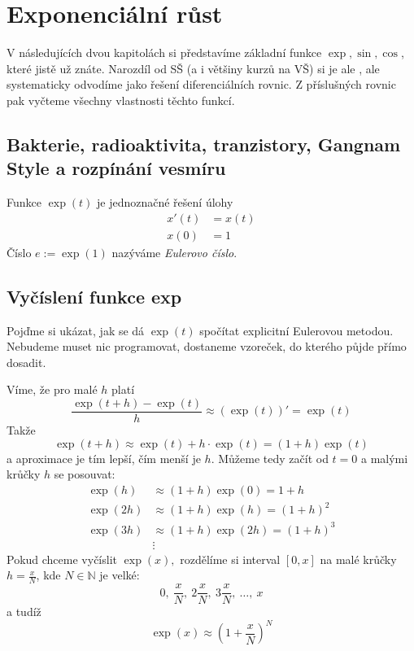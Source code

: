 \chapter{Exponenciální růst}
V následujících dvou kapitolách si představíme základní funkce $\exp, \sin, \cos$, které jistě už znáte. Narozdíl od SŠ (a i většiny kurzů na VŠ) si je ale , ale systematicky odvodíme jako řešení diferenciálních rovnic. Z příslušných rovnic pak vyčteme všechny vlastnosti těchto funkcí.

\section{Bakterie, radioaktivita, tranzistory, Gangnam Style a rozpínání vesmíru}

\begin{definice}
  Funkce $\exp(t)$ je jednoznačné řešení úlohy
  \begin{align*}
	  x'(t)&=x(t)\\
	  x(0)&=1
  \end{align*}
  Číslo $e:= \exp(1)$ nazýváme \emph{Eulerovo číslo}.
\end{definice}

\section{Vyčíslení funkce exp}
Pojďme si ukázat, jak se dá $\exp(t)$ spočítat explicitní Eulerovou metodou. Nebudeme muset nic programovat, dostaneme vzoreček, do kterého půjde přímo dosadit.

Víme, že pro malé $h$ platí
\begin{equation*}
  \frac{\exp(t+h)-\exp(t)}{h} \approx (\exp(t))'=\exp(t)
\end{equation*}
Takže 
\begin{equation*}
  \exp(t+h) \approx \exp(t)+h\cdot \exp(t) = (1+h)\exp(t)
\end{equation*}
a aproximace je tím lepší, čím menší je $h$. Můžeme tedy začít od $t=0$ a malými krůčky $h$ se posouvat:
\begin{align*}
	\exp(h) &\approx (1+h)\exp(0) = 1+h \\
	\exp(2h) &\approx (1+h)\exp(h) = (1+h)^{2} \\
	\exp(3h) &\approx (1+h)\exp(2h) = (1+h)^{3} \\
		 &\vdots
\end{align*}
Pokud chceme vyčíslit $\exp(x),$ rozdělíme si interval $[0,x]$ na malé krůčky $h=\frac{x}{N}$, kde $N\in \mathbb{N}$ je velké:
\begin{equation*}
  0,\ \frac{x}{N},\ 2\frac{x}{N},\ 3\frac{x}{N},\ \hdots,\ x
\end{equation*}
a tudíž
\begin{equation*}
  \exp(x)\approx \left(1+\frac{x}{N}\right)^{N}
\end{equation*}

